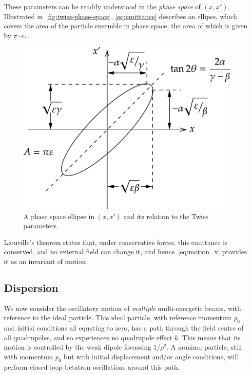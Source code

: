 \documentclass[11pt]{report}
\begin{document}
These parameters can be readily understood in the \textit{phase space} of $(x, x')$. Illustrated in~\autoref{fig:twiss-phase-space}, \autoref{eq:emittance} describes an ellipse, which covers the area of the particle ensemble in phase space, the area of which is given by $\pi\cdot\varepsilon$. 

\begin{figure}[h]
  \centering
  \includegraphics*[width=0.6\linewidth]{phase-space-with-twiss.png}
  \caption{A phase space ellipse in $(x, x')$ and its relation to the Twiss parameters.}
  \label{fig:twiss-phase-space}
\end{figure}

Liouville's theorem states that, under conservative forces, this emittance is conserved, and no external field can change it, and hence~\autoref{eq:motion_x} provides it as an invariant of motion. 

\subsection{Dispersion}\label{sec:transdisp}

We now consider the oscillatory motion of \textit{multiple} multi-energetic beams, with reference to the ideal particle. This ideal particle, with reference momentum $p_0$ and initial conditions all equating to zero, has a path through the field centre of all quadrupoles, and so experiences no quadrupole effect $k$. This means that its motion is controlled by the weak dipole focussing $1/\rho^2$. A nominal particle, still with momentum $p_0$ but with initial displacement and/or angle conditions, will perform closed-loop betatron oscillations around this path. 
\end{document}
